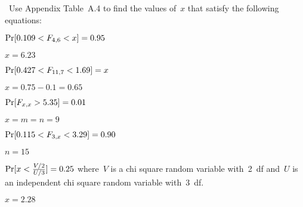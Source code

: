 \begin{problem}
  ~Use Appendix Table~A.4 to find the values of~$x$ that satisfy the following equations:
\end{problem}

\begin{subproblem}
  $\Pr\lbrack0.109 < F_{4,6} < x\rbrack = 0.95$
\end{subproblem}

${x = 6.23}$

\begin{subproblem}
  $\Pr\lbrack0.427 < F_{11,7} < 1.69\rbrack = x$
\end{subproblem}

${x = 0.75 - 0.1 = 0.65}$

\begin{subproblem}
  $\Pr\lbrack F_{x,x} > 5.35\rbrack = 0.01$
\end{subproblem}

${x = m = n = 9}$

\begin{subproblem}
  $\Pr\lbrack0.115 < F_{3,x} < 3.29\rbrack = 0.90$
\end{subproblem}

${n = 15}$

\begin{subproblem}
  $\Pr\lbrack x < \frac{V/2}{U/3}\rbrack = 0.25$ where~$V$ is a chi square random variable with~2~df and~$U$ is an independent chi square random variable with~3~df.
\end{subproblem}

${x = 2.28}$

